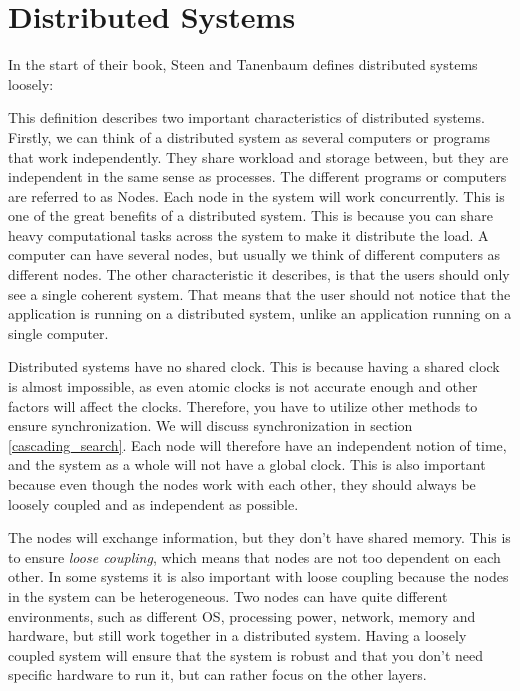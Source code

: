 

\section{Distributed Systems}\label{background:distributed_systems}
In the start of their book, Steen and Tanenbaum\cite{steen_distributed_2017} defines distributed systems loosely: 

This definition describes two important characteristics of distributed systems. Firstly, we can think of a distributed system as several computers or programs that work independently. They share workload and storage between, but they are independent in the same sense as processes. The different programs or computers are referred to as Nodes. Each node in the system will work concurrently. This is one of the great benefits of a distributed system. This is because you can share heavy computational tasks across the system to make it distribute the load. A computer can have several nodes, but usually we think of different computers as different nodes. The other characteristic it describes, is that the users should only see a single coherent system. That means that the user should not notice that the application is running on a distributed system, unlike an application running on a single computer.

Distributed systems have no shared clock. This is because having a shared clock is almost impossible, as even atomic clocks is not accurate enough and other factors will affect the clocks. Therefore, you have to utilize other methods to ensure synchronization. We will discuss synchronization in section \ref{cascading_search}. Each node will therefore have an independent notion of time, and the system as a whole will not have a global clock\cite{steen_distributed_2017}. This is also important because even though the nodes work with each other, they should always be loosely coupled and as independent as possible.

The nodes will exchange information, but they don’t have shared memory. This is to ensure \textit{loose coupling}, which means that nodes are not too dependent on each other. In some systems it is also important with loose coupling because the nodes in the system can be heterogeneous. Two nodes can have quite different environments, such as different OS, processing power, network, memory and hardware, but still work together in a distributed system. Having a loosely coupled system will ensure that the system is robust and that you don't need specific hardware to run it, but can rather focus on the other layers. 

